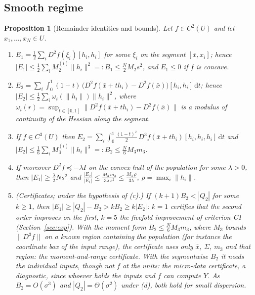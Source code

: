 \documentclass[10pt,a4paper]{article}
\theoremstyle{plain}
\newtheorem{proposition}[theorem]{Proposition}
\theoremstyle{definition}
\theoremstyle{remark}
\newcommand{\dd}{\mathrm{d}}
\begin{document}
\subsection{Smooth regime}

\begin{proposition}[Remainder identities and bounds]\label{prop:smooth}
Let $f\in C^2(U)$ and let $x_1,\dots,x_N\in U$.
\begin{enumerate}[label=(\alph*),leftmargin=2em]
\item $E_1=\frac12\sum_i D^2\!f(\xi_i)[h_i,h_i]$ for some $\xi_i$ on the segment $[\bar x,x_i]$; hence $|E_1|\le\frac12\sum_iM_2^{(i)}\|h_i\|^2=:B_1\le\frac N2M_2s^2$, and $E_1\le0$ if $f$ is concave.
\item $E_2=\sum_i\int_0^1(1-t)\,\big(D^2\!f(\bar x+th_i)-D^2\!f(\bar x)\big)[h_i,h_i]\,\dd t$; hence $|E_2|\le\frac12\sum_i\omega_i(\|h_i\|)\|h_i\|^2$, where $\omega_i(r)=\sup_{t\in[0,1]}\|D^2\!f(\bar x+th_i)-D^2\!f(\bar x)\|$ is a modulus of continuity of the Hessian along the segment.
\item If $f\in C^3(U)$ then $E_2=\sum_i\int_0^1\frac{(1-t)^2}{2}\,D^3\!f(\bar x+th_i)[h_i,h_i,h_i]\,\dd t$ and
$|E_2|\le\frac16\sum_iM_3^{(i)}\|h_i\|^3=:B_2\le\frac N6M_3m_3$.
\item If moreover $D^2\!f\preceq-\lambda I$ on the convex hull of the population for some $\lambda>0$, then $|E_1|\ge\frac\lambda2Ns^2$ and
$\frac{|E_2|}{|E_1|}\le\frac{M_3\,m_3}{3\lambda\,s^2}\le\frac{M_3\,\rho}{3\lambda}$, $\rho=\max_i\|h_i\|$.
\item (Certificates; under the hypothesis of (c).) If $(k+1)B_2<|Q_2|$ for some $k\ge1$, then $|E_1|\ge|Q_2|-B_2>kB_2\ge k|E_2|$: $k=1$ certifies that the second order improves on the first, $k=5$ the fivefold improvement of criterion C1 (Section~\ref{sec:exp}). With the moment form $B_2\le\frac N6M_3m_3$, where $M_3$ bounds $\|D^3\!f\|$ on a known region containing the population (for instance the coordinate box of the input range), the certificate uses only $\bar x$, $\Sigma$, $m_3$ and that region: the \emph{moment-and-range certificate}. With the segmentwise $B_2$ it needs the individual inputs, though not $f$ at the units: the \emph{micro-data certificate}, a diagnostic, since whoever holds the inputs and $f$ can compute $Y$. As $B_2=O(\sigma^3)$ and $|Q_2|=\Theta(\sigma^2)$ under (d), both hold for small dispersion.
\end{enumerate}
\end{proposition}
\end{document}
